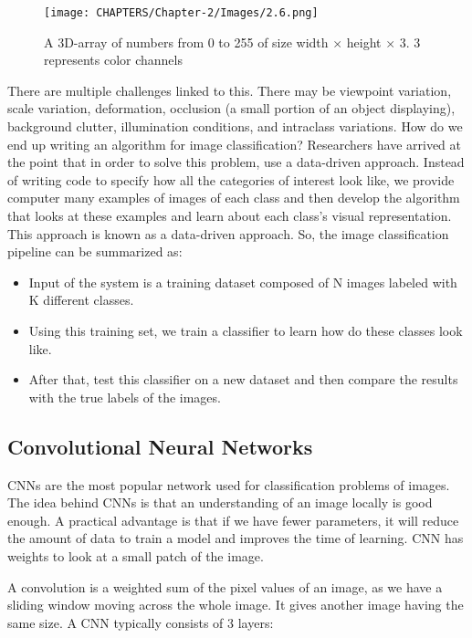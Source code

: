 \begin{figure}[H]
    \centering
    \captionsetup{justification=centering,margin=2cm}
    \texttt{[image: CHAPTERS/Chapter-2/Images/2.6.png]}
    \caption{A 3D-array of numbers from 0 to 255 of size width $\times$ height $\times$ 3. 3 represents color channels}
    \label{fig:2.6}
\end{figure}

There are multiple challenges linked to this. There may be viewpoint variation, scale variation, deformation, occlusion (a small portion of an object displaying), background clutter, illumination conditions, and intraclass variations. How do we end up writing an algorithm for image classification? Researchers have arrived at the point that in order to solve this problem, use a data-driven approach. Instead of writing code to specify how all the categories of interest look like, we provide computer many examples of images of each class and then develop the algorithm that looks at these examples and learn about each class's visual representation. This approach is known as a data-driven approach. So, the image classification pipeline can be summarized as:

\begin{itemize}
\item Input of the system is a training dataset composed of N images labeled with K different classes.
\item Using this training set, we train a classifier to learn how do these classes look like.
\item After that, test this classifier on a new dataset and then compare the results with the true labels of the images.
\end{itemize}

\subsection{Convolutional Neural Networks}

CNNs are the most popular network used for classification problems of images. The idea behind CNNs is that an understanding of an image locally is good enough. A practical advantage is that if we have fewer parameters, it will reduce the amount of data to train a model and improves the time of learning. CNN has weights to look at a small patch of the image. 

A convolution is a weighted sum of  the pixel values of an image, as 
we have a sliding window moving across the whole image. It gives another 
image having the same size. A CNN typically consists of 3 layers:

